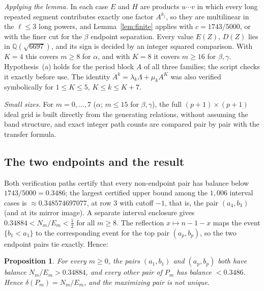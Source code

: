 \documentclass[11pt]{amsart}
\newtheorem{proposition}[theorem]{Proposition}
\theoremstyle{definition}
\theoremstyle{remark}
\begin{document}
\emph{Applying the lemma.} In each case $E$ and $H$ are products $u\cdots v$ in which every long repeated segment contributes exactly one factor $A^{k_j}$, so they are multilinear in the $\ell\le3$ long powers, and Lemma~\ref{lem:finite} applies with $c=1743/5000$, or with the finer cut for the $\beta$ endpoint separation. Every value $E(Z)$, $D(Z)$ lies in $\mathbb{Q}(\sqrt{6697})$, and its sign is decided by an integer squared comparison. With $K=4$ this covers $m\ge8$ for $\alpha$, and with $K=8$ it covers $m\ge16$ for $\beta,\gamma$. Hypothesis~(a) holds for the period block $A$ of all three families; the script checks it exactly before use. The identity $A^k=\lambda_k\Lambda+\mu_kA^K$ was also verified symbolically for $1\le K\le5$, $K\le k\le K+7$.

\emph{Small sizes.} For $m=0,\dots,7$ ($\alpha$; $m\le15$ for $\beta,\gamma$), the full $(p+1)\times(p+1)$ ideal grid is built directly from the generating relations, without assuming the band structure, and exact integer path counts are compared pair by pair with the transfer formula.

\subsection*{The two endpoints and the result}
Both verification paths certify that every non-endpoint pair has balance below $1743/5000=0.3486$; the largest certified upper bound among the $1{,}006$ interval cases is $\approx0.348574697077$, at row $3$ with cutoff $-1$, that is, the pair $(a_4,b_3)$ (and at its mirror image). A separate interval enclosure gives $0.34884<N_m/E_m<\tfrac12$ for all $m\ge8$. The reflection $x\mapsto n-1-x$ maps the event $\{b_1<a_1\}$ to the corresponding event for the top pair $(a_p,b_p)$, so the two endpoint pairs tie exactly. Hence:

\begin{proposition}\label{prop:dom}
For every $m\ge0$, the pairs $(a_1,b_1)$ and $(a_p,b_p)$ both have balance $N_m/E_m>0.34884$, and every other pair of $P_m$ has balance $<0.3486$. Hence $\delta(P_m)=N_m/E_m$, and the maximizing pair is not unique.
\end{proposition}
\end{document}
